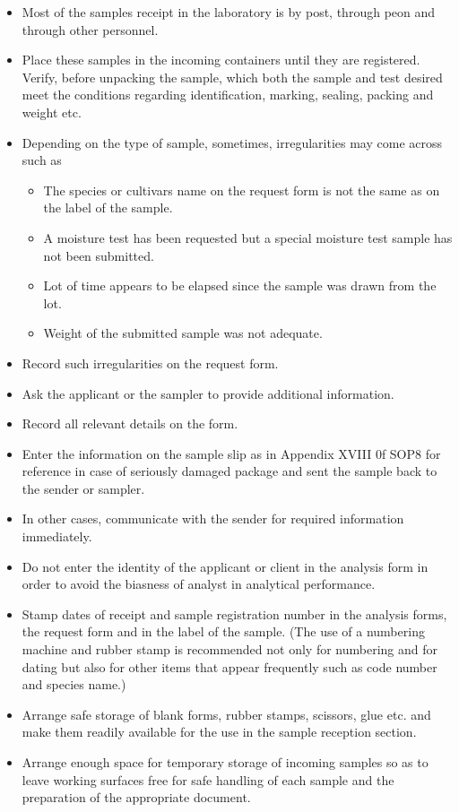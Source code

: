 \documentclass[]{book}
\providecommand{\tightlist}{%
  \setlength{\itemsep}{0pt}\setlength{\parskip}{0pt}}
\begin{document}
\begin{itemize}
\tightlist
\item
  Most of the samples receipt in the laboratory is by post, through peon
  and through other personnel.
\item
  Place these samples in the incoming containers until they are
  registered. Verify, before unpacking the sample, which both the sample
  and test desired meet the conditions regarding identification,
  marking, sealing, packing and weight etc.
\item
  Depending on the type of sample, sometimes, irregularities may come
  across such as

  \begin{itemize}
  \tightlist
  \item
    The species or cultivars name on the request form is not the same as
    on the label of the sample.
  \item
    A moisture test has been requested but a special moisture test
    sample has not been submitted.
  \item
    Lot of time appears to be elapsed since the sample was drawn from
    the lot.
  \item
    Weight of the submitted sample was not adequate.
  \end{itemize}
\item
  Record such irregularities on the request form.
\item
  Ask the applicant or the sampler to provide additional information.
\item
  Record all relevant details on the form.
\item
  Enter the information on the sample slip as in Appendix XVIII 0f SOP8
  for reference in case of seriously damaged package and sent the sample
  back to the sender or sampler.
\item
  In other cases, communicate with the sender for required information
  immediately.
\item
  Do not enter the identity of the applicant or client in the analysis
  form in order to avoid the biasness of analyst in analytical
  performance.
\item
  Stamp dates of receipt and sample registration number in the analysis
  forms, the request form and in the label of the sample. (The use of a
  numbering machine and rubber stamp is recommended not only for
  numbering and for dating but also for other items that appear
  frequently such as code number and species name.)
\item
  Arrange safe storage of blank forms, rubber stamps, scissors, glue
  etc. and make them readily available for the use in the sample
  reception section.
\item
  Arrange enough space for temporary storage of incoming samples so as
  to leave working surfaces free for safe handling of each sample and
  the preparation of the appropriate document.
\end{itemize}
\end{document}
